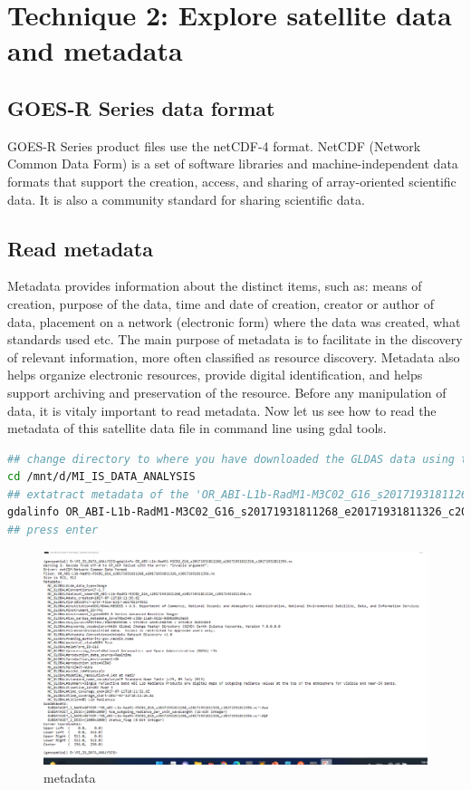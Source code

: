 \section{Technique 2: Explore satellite data and metadata}
\subsection{ GOES-R Series data format}
GOES-R Series product files use the netCDF-4 format.
NetCDF (Network Common Data Form) is a set of software libraries and machine-independent data formats that support the creation, access, and sharing of array-oriented scientific data. It is also a community standard for sharing scientific data.
\subsection{Read metadata}
Metadata provides information about the distinct items, such as: means of creation, purpose of 
the data, time and date of creation, creator or author of data, placement on a network (electronic 
form) where the data was created, what standards used etc.
The main purpose of metadata is to facilitate in the discovery of relevant information, more often 
classified as resource discovery. Metadata also helps organize electronic resources, provide 
digital identification, and helps support archiving and preservation of the resource.
Before any manipulation of data, it is vitaly important to read metadata.
Now let us see how to read the metadata of this satellite data file in command line using gdal tools.
\begin{lstlisting}[language=Bash]
## change directory to where you have downloaded the GLDAS data using the below
cd /mnt/d/MI_IS_DATA_ANALYSIS
## extatract metadata of the 'OR_ABI-L1b-RadM1-M3C02_G16_s20171931811268_e20171931811326_c20171931811356.nc' 
gdalinfo OR_ABI-L1b-RadM1-M3C02_G16_s20171931811268_e20171931811326_c20171931811356.nc
## press enter
\end{lstlisting}
\begin{figure}[H]
\begin{center}
\includegraphics[scale=0.5]{gdal1.png} %
\end{center}
\caption{metadata}
\label{metadta}%
\end{figure}

